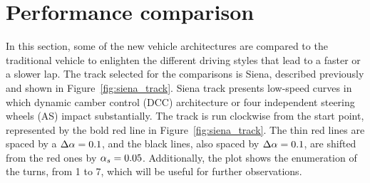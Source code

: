 \section{Performance comparison}
\label{sec:performance_comparison}

In this section, some of the new vehicle architectures are compared to the traditional vehicle to enlighten the different driving styles that lead to a faster or a slower lap. The track selected for the comparisons is Siena, described previously and shown in Figure~\ref{fig:siena_track}. Siena track presents low-speed curves in which dynamic camber control (DCC) architecture or four independent steering wheels (AS) impact substantially. The track is run clockwise from the start point, represented by the bold red line in Figure~\ref{fig:siena_track}. The thin red lines are spaced by a $\Delta\alpha=0.1$, and the black lines, also spaced by $\Delta\alpha=0.1$, are shifted from the red ones by $\alpha_s=0.05$. Additionally, the plot shows the enumeration of the turns, from 1 to 7, which will be useful for further observations.

